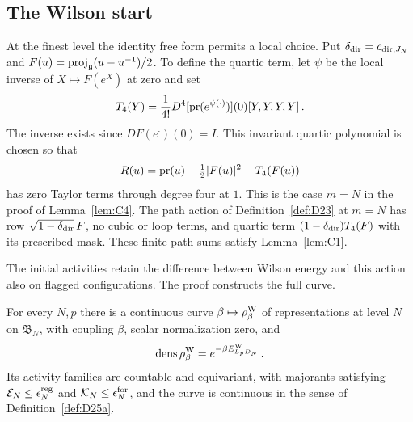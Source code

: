 \subsection{The Wilson start}\label{subsec:D-Wilson}

At the finest level the identity free form permits a local choice. Put $\delta_{\rm dir}=c_{{\rm dir},J_N}$ and $F(u)=\operatorname{proj}_{\mathfrak{g}}(u-u^{-1})/2$. To define the quartic term, let $\psi$ be the local inverse of $X\mapsto F(e^X)$ at zero and set
\begin{equation*}
T_4(Y)=\frac1{4!}D^4[\operatorname{pr}(e^{\psi(\cdot)})](0)[Y,Y,Y,Y]\,.
\end{equation*}
The inverse exists since $DF(e^{\cdot})(0)=I$. This invariant quartic polynomial is chosen so that
\begin{equation}\label{eq:D-Wilson-remainder}
R(u)=\operatorname{pr}(u)-\tfrac12|F(u)|^2-T_4(F(u))
\end{equation}
has zero Taylor terms through degree four at $1$. This is the case $m=N$ in the proof of Lemma~\ref{lem:C4}. The path action of Definition~\ref{def:D23} at $m=N$ has row $\sqrt{1-\delta_{\rm dir}}\,F$, no cubic or loop terms, and quartic term $(1-\delta_{\rm dir})T_4(F)$ with its prescribed mask. These finite path sums satisfy Lemma~\ref{lem:C1}.

The initial activities retain the difference between Wilson energy and this action also on flagged configurations. The proof constructs the full curve.

\begin{samepage}
\begin{lemma}\label{lem:D3}
For every $N,p$ there is a continuous curve $\beta\mapsto\rho^{\rm W}_\beta$ of representations at level $N$ on $\mathfrak B_N$, with coupling $\beta$, scalar normalization zero, and
\begin{equation*}
\operatorname{dens}\rho^{\rm W}_\beta=e^{-\beta E^{\rm W}_{L_pD_N}}\,.
\end{equation*}
Its activity families are countable and equivariant, with majorants satisfying $\mathcal E_N\le\epsilon_N^{\rm reg}$ and $\mathcal K_N\le\epsilon_N^{\rm for}$, and the curve is continuous in the sense of Definition~\ref{def:D25a}.
\end{lemma}
\end{samepage}


